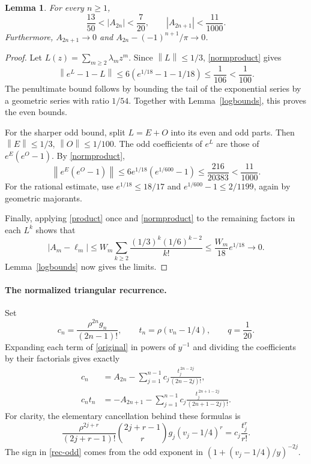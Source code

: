 \documentclass[11pt]{article}
\newtheorem{lemma}{Lemma}
\newcommand{\norm}[1]{\left\lVert #1\right\rVert}
\begin{document}
\begin{lemma}\label{functionbounds}
For every \(n\ge1\),
\[
 \frac{13}{50}<|A_{2n}|<\frac7{20},\qquad
 |A_{2n+1}|<\frac{11}{1000}.
\]
Furthermore, \(A_{2n+1}\to0\) and
\(A_{2n}-(-1)^{n+1}/\pi\to0\).
\end{lemma}
\begin{proof}
Let \(L(z)=\sum_{m\ge2}\lambda_m z^m\).
Since \(\norm{L}\le1/3\), \eqref{normproduct} gives
\[
 \norm{e^L-1-L}\le
 6(e^{1/18}-1-1/18)\le\frac1{106}<\frac1{100}.
\]
The penultimate bound follows by bounding the tail of the exponential
series by a geometric series with ratio \(1/54\).
Together with Lemma~\ref{logbounds}, this proves the even bounds.

For the sharper odd bound, split \(L=E+O\) into its even and odd parts.
Then \(\norm{E}\le1/3\), \(\norm{O}\le1/100\).
The odd coefficients of \(e^L\) are those of
\(e^E(e^O-1)\). By \eqref{normproduct},
\[
 \norm{e^E(e^O-1)}
 \le6e^{1/18}(e^{1/600}-1)
 \le\frac{216}{20383}<\frac{11}{1000}.
\]
For the rational estimate, use \(e^{1/18}\le18/17\) and
\(e^{1/600}-1\le2/1199\), again by geometric majorants.

Finally, applying \eqref{product} once and \eqref{normproduct}
to the remaining factors in each \(L^k\) shows that
\[
 |A_m-\ell_m|\le
 W_m\sum_{k\ge2}\frac{(1/3)^k(1/6)^{k-2}}{k!}
 \le\frac{W_m}{18}e^{1/18}\longrightarrow0.
\]
Lemma~\ref{logbounds} now gives the limits.
\end{proof}

\paragraph{The normalized triangular recurrence.}
Set
\[
 c_n=\frac{\rho^{2n}g_n}{(2n-1)!},\qquad
 t_n=\rho(v_n-1/4),\qquad q=\frac1{20}.
\]
Expanding each term of \eqref{original} in powers of \(y^{-1}\)
and dividing the coefficients by their factorials gives exactly
\begin{align}
 c_n&=A_{2n}-\sum_{j=1}^{n-1}
             c_j\frac{t_j^{\,2n-2j}}{(2n-2j)!},\label{rec-even}\\
 c_nt_n&=-A_{2n+1}-\sum_{j=1}^{n-1}
             c_j\frac{t_j^{\,2n+1-2j}}{(2n+1-2j)!}.\label{rec-odd}
\end{align}
For clarity, the elementary cancellation behind these formulas is
\[
 \frac{\rho^{2j+r}}{(2j+r-1)!}
 \binom{2j+r-1}{r}g_j(v_j-1/4)^r
 =c_j\frac{t_j^r}{r!}.
\]
The sign in \eqref{rec-odd} comes from the odd exponent in
\((1+(v_j-1/4)/y)^{-2j}\).
\end{document}
